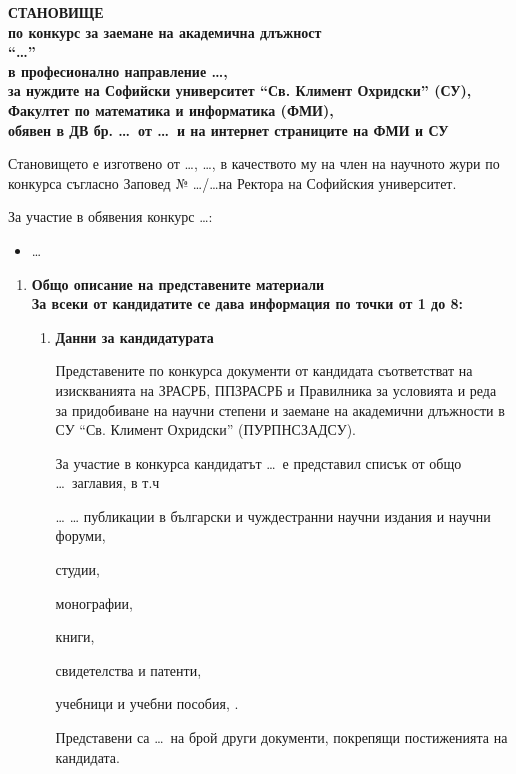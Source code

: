 \documentclass[a4paper]{report}
\def\assocprof{доцент}
\def\prof{професор}
\def\position{\ldots}          %
\def\statepaperno{\ldots}      %
\def\statepaperdate{\ldots}    %
\def\reviewer{\ldots}          %
\def\reviewerprofarea{\ldots}  %
\def\orderno{\ldots}           %
\def\orderdate{\ldots}         %
\def\singlecandidate{е подал документи \textbf{единствен кандидат}}
\def\manycandidates{са подали документи \textbg{следните кандидати}}
\def\candidatenumber{\ldots}        %
\newcommand{\candidate}[1]{\item #1}
\newenvironment{candidates}{\begin{itemize}}{\end{itemize}}
\def\candidatename{\ldots}                %
\def\titlecount{\ldots}                   %
\def\otherdocscount{\ldots}               %
\newcommand{\titletype}[2]{
  \ifx\testforempty#2\testforempty
  \relax
  \else
  #2 #1,
  \fi}
\newcommand{\papers}{\titletype{публикации в български и чуждестранни научни издания и научни форуми}}
\newcommand{\studia}{\titletype{студии}}
\newcommand{\monographs}{\titletype{монографии}}
\newcommand{\books}{\titletype{книги}}
\newcommand{\patents}{\titletype{свидетелства и патенти}}
\newcommand{\textbooks}{\titletype{учебници и учебни пособия}}
\begin{document}
\begin{center}
  \Large\bfseries\MakeUppercase{Становище}\\
  \small
  по конкурс за заемане на академична длъжност\\
  ``\position''\\
  в професионално направление \position,\\
  за нуждите на Софийски университет ``Св. Климент Охридски'' (СУ),\\
  Факултет по математика и информатика (ФМИ),\\
  обявен в ДВ бр. \statepaperno\ от \statepaperdate\ и на интернет страниците на ФМИ и СУ
\end{center}

Становището е изготвено от \reviewer, \reviewerprofarea, в качеството му на член на научното жури по конкурса съгласно Заповед № \orderno/\orderdate на Ректора на Софийския университет.

За участие в обявения конкурс \candidatenumber:

\begin{candidates}
\candidate{\ldots} %
\end{candidates}

\begin{enumerate}[label=\textbf{\Roman*.}]
\item \textbf{Общо описание на представените материали\\
    За всеки от кандидатите се дава информация по точки от 1 до 8:}

  \begin{enumerate}[label=\textbf{\arabic*.}]
  \item \textbf{Данни за кандидатурата}

    Представените по конкурса документи от кандидата съответстват на изискванията на ЗРАСРБ, ППЗРАСРБ и Правилника за условията и реда за придобиване на научни степени и заемане на академични длъжности в СУ ``Св. Климент Охридски'' (ПУРПНСЗАДСУ).

    За участие в конкурса кандидатът \candidatename\ е представил списък от общо \titlecount\ заглавия, в т.ч
    \papers{\ldots}
    \studia{}
    \monographs{}
    \books{}
    \patents{}
    \textbooks{}.

    Представени са \otherdocscount\ на брой други документи, покрепящи постиженията на кандидата.
    
  \end{enumerate}
\end{enumerate}
\end{document}
